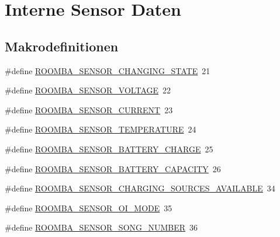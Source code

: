\hypertarget{group__roomba__sensor__intern}{\section{Interne Sensor Daten}
\label{group__roomba__sensor__intern}
}
\subsection*{Makrodefinitionen}
\begin{DoxyCompactItemize}
\item 
\#define \hyperlink{group__roomba__sensor__intern_ga996bd41e2f66674069153469ddd81bc2}{R\-O\-O\-M\-B\-A\-\_\-\-S\-E\-N\-S\-O\-R\-\_\-\-C\-H\-A\-N\-G\-I\-N\-G\-\_\-\-S\-T\-A\-T\-E}~21
\item 
\#define \hyperlink{group__roomba__sensor__intern_gabb81e3accaa18eb61bbbe3ebe3f30f41}{R\-O\-O\-M\-B\-A\-\_\-\-S\-E\-N\-S\-O\-R\-\_\-\-V\-O\-L\-T\-A\-G\-E}~22
\item 
\#define \hyperlink{group__roomba__sensor__intern_ga39e2a5775498c73671ae9b6baeef3cc6}{R\-O\-O\-M\-B\-A\-\_\-\-S\-E\-N\-S\-O\-R\-\_\-\-C\-U\-R\-R\-E\-N\-T}~23
\item 
\#define \hyperlink{group__roomba__sensor__intern_ga85ef57858eeae88cc5df14dcf15b0b8f}{R\-O\-O\-M\-B\-A\-\_\-\-S\-E\-N\-S\-O\-R\-\_\-\-T\-E\-M\-P\-E\-R\-A\-T\-U\-R\-E}~24
\item 
\#define \hyperlink{group__roomba__sensor__intern_gaf36f587e37b046e2027f47122e90c077}{R\-O\-O\-M\-B\-A\-\_\-\-S\-E\-N\-S\-O\-R\-\_\-\-B\-A\-T\-T\-E\-R\-Y\-\_\-\-C\-H\-A\-R\-G\-E}~25
\item 
\#define \hyperlink{group__roomba__sensor__intern_ga32f657606300ed2451da4f59ab907b20}{R\-O\-O\-M\-B\-A\-\_\-\-S\-E\-N\-S\-O\-R\-\_\-\-B\-A\-T\-T\-E\-R\-Y\-\_\-\-C\-A\-P\-A\-C\-I\-T\-Y}~26
\item 
\#define \hyperlink{group__roomba__sensor__intern_ga5bc38d7d65a84eeb27a862ac7ac7368d}{R\-O\-O\-M\-B\-A\-\_\-\-S\-E\-N\-S\-O\-R\-\_\-\-C\-H\-A\-R\-G\-I\-N\-G\-\_\-\-S\-O\-U\-R\-C\-E\-S\-\_\-\-A\-V\-A\-I\-L\-A\-B\-L\-E}~34
\item 
\#define \hyperlink{group__roomba__sensor__intern_gaf6d24f3798d3c267ef8d2b5d56c1e28a}{R\-O\-O\-M\-B\-A\-\_\-\-S\-E\-N\-S\-O\-R\-\_\-\-O\-I\-\_\-\-M\-O\-D\-E}~35
\item 
\#define \hyperlink{group__roomba__sensor__intern_ga370ac0d8ea032e38d3587e25a0f4d328}{R\-O\-O\-M\-B\-A\-\_\-\-S\-E\-N\-S\-O\-R\-\_\-\-S\-O\-N\-G\-\_\-\-N\-U\-M\-B\-E\-R}~36

\end{DoxyCompactItemize}
